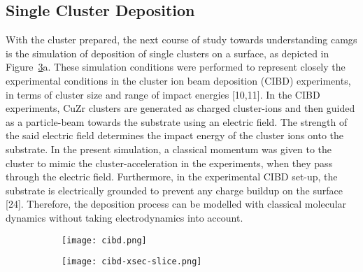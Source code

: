 \subsection{Single Cluster Deposition}
\begin{selfcite}
With the cluster prepared, the next course of study towards understanding \gls{camg}s is the simulation of deposition of single clusters on a surface, as depicted in Figure~\ref{f:cibdsmod}a. These simulation conditions were performed to represent closely the experimental conditions in the cluster ion beam deposition (CIBD) experiments, in terms of cluster size and range of impact energies [10,11]. In the CIBD experiments, CuZr clusters are generated as charged cluster-ions and then guided as a particle-beam towards the substrate using an electric field. The strength of the said electric field determines the impact energy of the cluster ions onto the substrate.  In the present simulation, a classical momentum was given to the cluster to mimic the cluster-acceleration in the experiments, when they pass through the electric field. Furthermore, in the experimental CIBD set-up, the substrate is electrically grounded to prevent any charge buildup on the surface [24]. Therefore, the deposition process can be modelled with classical molecular dynamics without taking electrodynamics into account. \par

\begin{figure}[!ht] \centering
	\begin{subfigure}{0.45\textwidth}
		\texttt{[image: cibd.png]}
		\caption{}
		\label{fig:single}
	\end{subfigure}%
	\hspace{1cm}
	\begin{subfigure}{0.45\textwidth}
		\texttt{[image: cibd-xsec-slice.png]}
		\caption{}
		\label{f:single_xsec}
	\end{subfigure}
	\label{f:cibdsmod}
\end{figure}


\end{selfcite}
